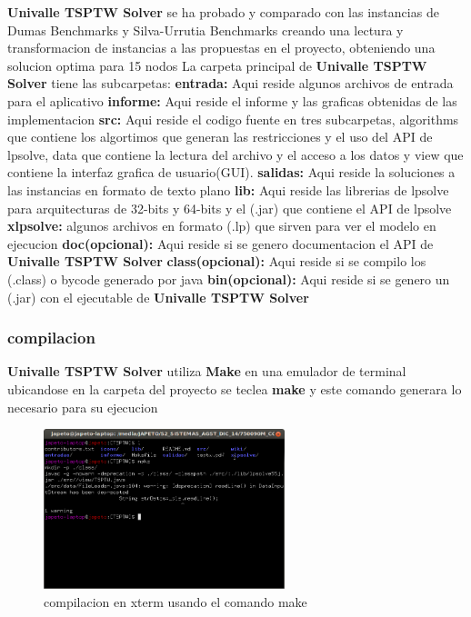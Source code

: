 \documentclass[journal, a4paper]{IEEEtran}
\begin{document}
\textbf{Univalle TSPTW Solver} se ha probado y comparado con las instancias de 
Dumas Benchmarks \cite{HOP93} y Silva-Urrutia Benchmarks\cite{HOP91} creando una 
lectura y transformacion de instancias a las propuestas en el proyecto, obteniendo
una solucion optima para 15 nodos 
La carpeta principal de \textbf{Univalle TSPTW Solver} tiene las subcarpetas:
\textbf{entrada:} Aqui reside algunos archivos de entrada para el aplicativo
\textbf{informe:} Aqui reside el informe y las graficas obtenidas de las implementacion
\textbf{src:} Aqui reside el codigo fuente en tres subcarpetas, algorithms que contiene los
algortimos que generan las restricciones y el uso del API de lpsolve, data que contiene
la lectura del archivo y el acceso a los datos y view que contiene la interfaz grafica de usuario(GUI).
\textbf{salidas:} Aqui reside la soluciones a las instancias en formato de texto plano
\textbf{lib:} Aqui reside las librerias de lpsolve para arquitecturas de 32-bits y 64-bits y el (.jar) que 
contiene el API de lpsolve
\textbf{xlpsolve:} algunos archivos en formato (.lp) que sirven para ver el modelo en ejecucion 
\textbf{doc(opcional):} Aqui reside si se genero documentacion el API de \textbf{Univalle TSPTW Solver}
\textbf{class(opcional):} Aqui reside si se compilo los (.class) o bycode generado por java
\textbf{bin(opcional):} Aqui reside si se genero un (.jar) con el ejecutable de \textbf{Univalle TSPTW Solver}
\subsubsection{compilacion}
\textbf{Univalle TSPTW Solver} utiliza \textbf{Make} en una emulador de terminal
ubicandose en la carpeta del proyecto se teclea \textbf{make} y este comando generara
lo necesario para su ejecucion
\begin{figure}[H]
\centering
  \includegraphics[width=70mm]{emulador.png}
  \caption{compilacion en xterm usando el comando make}
  \label{usando el comando make}
\end{figure}
\end{document}
